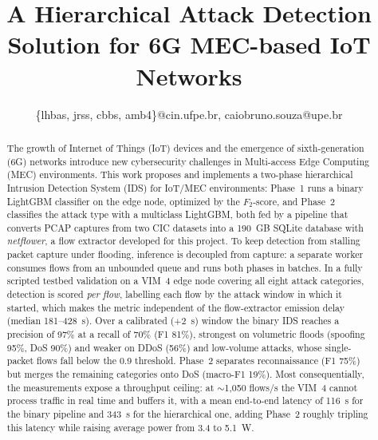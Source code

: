 \documentclass[conference]{IEEEtran}
\begin{document}
\title{A Hierarchical Attack Detection Solution for 6G MEC-based IoT Networks}



\author{


\{lhbas, jrss, cbbs, amb4\}@cin.ufpe.br, caiobruno.souza@upe.br}

\maketitle

\begin{abstract}
The growth of Internet of Things (IoT) devices and the emergence of
sixth-generation (6G) networks introduce new cybersecurity challenges in
Multi-access Edge Computing (MEC) environments. This work proposes and
implements a two-phase hierarchical Intrusion Detection System (IDS) for
IoT/MEC environments: Phase~1 runs a binary LightGBM classifier on the edge
node, optimized by the $F_2$-score, and Phase~2 classifies the attack type
with a multiclass LightGBM, both fed by a pipeline that converts PCAP captures
from two CIC datasets into a 190~GB SQLite database with \textit{netflower}, a
flow extractor developed for this project. To keep detection from stalling
packet capture under flooding, inference is decoupled from capture: a separate
worker consumes flows from an unbounded queue and runs both phases in batches.
In a fully scripted testbed validation on a VIM~4 edge node covering all eight
attack categories, detection is scored \emph{per flow}, labelling each flow by
the attack window in which it started, which makes the metric independent of the
flow-extractor emission delay (median 181--428~s). Over a calibrated ($+2$~s)
window the binary IDS reaches a precision of 97\% at a recall of 70\% (F1 81\%),
strongest on volumetric floods (spoofing 95\%, DoS 90\%) and weaker on DDoS
(56\%) and low-volume attacks, whose single-packet flows fall below the 0.9
threshold. Phase~2 separates reconnaissance (F1 75\%) but merges the remaining
categories onto DoS (macro-F1 19\%). Most consequentially, the measurements
expose a throughput ceiling: at $\sim$1{,}050 flows/s the VIM~4 cannot process
traffic in real time and buffers it, with a mean end-to-end latency of 116~s for
the binary pipeline and 343~s for the hierarchical one, adding Phase~2 roughly
tripling this latency while raising average power from 3.4 to 5.1~W.
\end{abstract}
\end{document}
